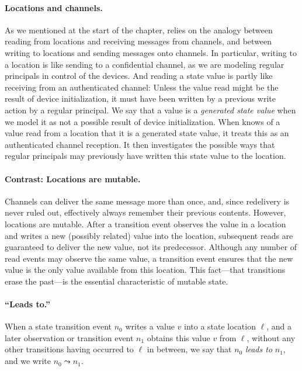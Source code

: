 \paragraph{Locations and channels.}  As we mentioned at the start of
the chapter, {\cpsa} relies on the analogy between reading from
locations and receiving messages from channels, and between writing to
locations and sending messages onto channels.  In particular, writing
to a location is like sending to a confidential channel, as we are
modeling regular principals in control of the devices.  And reading a
state value is partly like receiving from an authenticated channel:
Unless the value read might be the result of device initialization, it
must have been written by a previous write action by a regular
principal.  We say that a value is a \emph{generated state value} when
we model it as not a possible result of device initialization.  When
{\cpsa} knows of a value read from a location that it is a generated
state value, it treats this as an authenticated channel reception.  It
then investigates the possible ways that regular principals may
previously have written this state value to the location.

\paragraph{Contrast:  Locations are mutable.}  Channels can deliver
the same message more than once, and, since redelivery is never ruled
out, effectively always remember their previous contents.  However,
locations are mutable.  After a transition event observes the value in
a location and writes a new (possibly related) value into the
location, subsequent reads are guaranteed to deliver the new value,
not its predecessor.  Although any number of read events may observe
the same value, a transition event ensures that the new value is the
only value available from this location.  This fact---that transitions
erase the past---is the essential characteristic of mutable state.


\paragraph{``Leads to.''}  When a state transition event $n_0$ writes
a value $v$ into a state location $\ell$, and a later observation or
transition event $n_1$ obtains this value $v$ from $\ell$, without any
other transitions having occurred to $\ell$ in between, we say that
$n_0$ \emph{leads to} $n_1$, and we write $n_0\leadsto n_1$.



